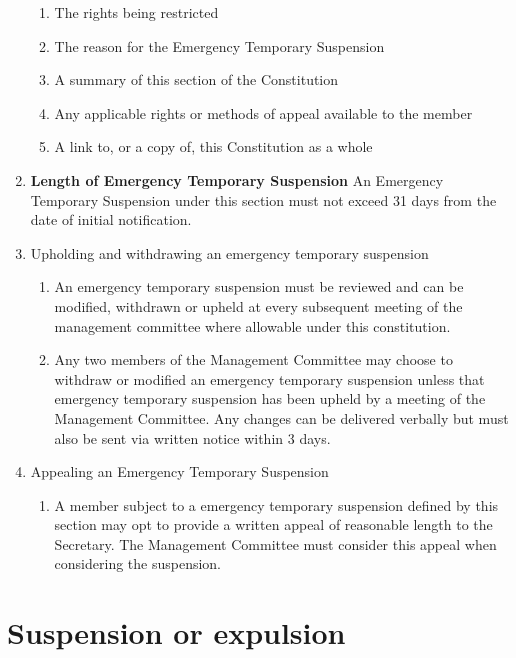 \begin{enumerate}
\begin{enumerate}
  \item The rights being restricted\\
  \item The reason for the Emergency Temporary Suspension\\
  \item A summary of this section of the Constitution\\
  \item Any applicable rights or methods of appeal available to the member
  \item A link to, or a copy of, this Constitution as a whole\\
  \end{enumerate}
\item \textbf{Length of Emergency Temporary Suspension} An Emergency Temporary Suspension under this section must not exceed 31 days from the date of initial notification.\\
\item Upholding and withdrawing an emergency temporary suspension

  \begin{enumerate}
  
  \item An emergency temporary suspension must be reviewed and can be modified, withdrawn or upheld at every subsequent meeting of the management committee where allowable under this constitution.
  \item Any two members of the Management Committee may choose to withdraw or modified an emergency temporary suspension unless that emergency temporary suspension has been upheld by a meeting of the Management Committee. Any changes can be delivered verbally but must also be sent via written notice within 3 days.\\
  \end{enumerate}
\item Appealing an Emergency Temporary Suspension

  \begin{enumerate}
  
  \item A member subject to a emergency temporary suspension defined by this section may opt to provide a written appeal of reasonable length to the Secretary. The Management Committee must consider this appeal when considering the suspension.
  \end{enumerate}
\end{enumerate}

\hypertarget{suspension-or-expulsion}{%
\section{Suspension or expulsion}\label{suspension-or-expulsion}}


